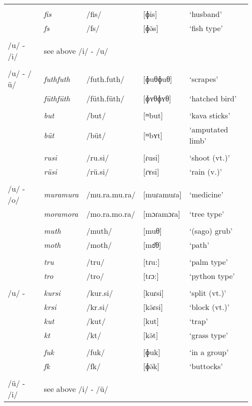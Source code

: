 \begin{longtable} {lllll}
		&&&&\\
		& \emph{fis} & /fis/ & [ɸis] & `husband'\\
		& \emph{fs} & /fs/ & [ɸə̆s] & `fish type'\\
		&&&&\\
		/u/ - /i/ & \multicolumn{4}{l}{see above /i/ - /u/}\\
		&&&&\\
		/u/ - /ü/ & \emph{futhfuth} & /futh.futh/ & [ɸuθɸuθ] & `scrapes'\\
		& \emph{füthfüth} & /füth.füth/ & [ɸʏθɸʏθ] & `hatched bird'\\
		&&&&\\
		& \emph{but} & /but/ & [ᵐbut] & `kava sticks'\\
		& \emph{büt} & /büt/ & [ᵐbʏt] & `amputated limb'\\
		&&&&\\
		& \emph{rusi} & /ru.si/ & [ɾusi] & `shoot (vt.)'\\
		& \emph{rüsi} & /rü.si/ & [ɾʏsi] & `rain (v.)'\\
		&&&&\\
		/u/ - /o/ & \emph{muramura} & /mu.ra.mu.ra/ & [muɾamuɾa] & `medicine'\\
		& \emph{moramora} & /mo.ra.mo.ra/ & [mɔɾamɔɾa] & `tree type'\\
		&&&&\\
		& \emph{muth} & /muth/ & [muθ] & `(sago) grub'\\
		& \emph{moth} & /moth/ & [mɞ̆θ] & `path'\\
		&&&&\\
		& \emph{tru} & /tru/ & [tɾu:] & `palm type'\\
		& \emph{tro} & /tro/ & [tɾɔ:] & `python type'\\
		&&&&\\
		/u/ - \Zero{} & \emph{kursi} & /kur.si/ & [kuɾsi] & `split (vt.)'\\
		& \emph{krsi}  & /kr.si/  &	[kə̆ɾsi] & `block (vt.)'\\
		& \emph{kut} & /kut/ & [kut] & `trap'\\
		& \emph{kt} & /kt/ & [kə̆t] & `grass type'\\
		&&&&\\
		& \emph{fuk} & /fuk/ & [ɸuk] & `in a group'\\
		& \emph{fk} & /fk/ & [ɸə̆k] & `buttocks'\\
		&&&&\\
		/ü/ - /i/ & \multicolumn{4}{l}{see above /i/ - /ü/}\\

\end{longtable}
